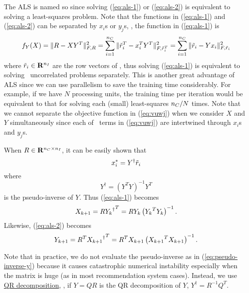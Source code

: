 The ALS is named so since solving (\ref{eq:als-1}) or (\ref{eq:als-2}) is equivalent to solving a least-squares problem.
Note that the functions in (\ref{eq:als-1}) and (\ref{eq:als-2}) can be separated by $x_i$s or $y_j$s,
\eg, the function in (\ref{eq:als-1}) is
\begin{equation}
\label{eq:bian}
f_Y(X) = \|R - XY^T\|_{F,R}^2
= \sum_{i=1}^{{n_C}} \|\tilde{r}_i^T-x_i^T Y^T\|_{F,\tilde{r}_i^T}^2
= \sum_{i=1}^{{n_C}} \|\tilde{r}_i-Yx_i\|_{F,\tilde{r}_i}^2
\end{equation}
where $\tilde{r}_i \in\mathbf{R}^{{n_I}}$ are the row vectors of \ratmat,
thus solving (\ref{eq:als-1}) is equivalent to solving \numcus\ uncorrelated problems separately.
This is another great advantage of ALS since we can use parallelism to save the training time considerably.
For example, if we have $N$ processing units, the training time per iteration would be equivalent to
that for solving each (small) least-squares ${n_C}/N$ times.
Note that we cannot separate the objective function in (\ref{eq:vuwj}) when we consider $X$ and $Y$ simultaneously
since each of \numrating\ terms in (\ref{eq:vuwj}) are intertwined through $x_i$s and $y_j$s.

When $R\in\mathbf{R}^{{n_C}\times{n_I}}$, it can be easily shown that
\begin{equation}
x_i^\ast =  Y^\dagger \tilde{r}_i
\end{equation}
where
\begin{equation}
\label{eq:pseudo-inverse-y}
Y^\dagger = (Y^TY)^{-1}Y^T
\end{equation}
is the pseudo-inverse of $Y$.
Thus (\ref{eq:als-1}) becomes
\begin{equation}
\label{eq:als-1-sol}
{{X}_{k+1}} = R {{{{Y}_{k}}}^\dagger}^T
= R {{{Y}_{k}}} \left({{{Y}_{k}}}^T{{{Y}_{k}}} \right)^{-1}.
\end{equation}
Likewise, (\ref{eq:als-2}) becomes
\begin{equation}
\label{eq:als-2-sol}
{{Y}_{k+1}} = R^T {{{{X}_{k+1}}}^\dagger}^T
= R^T {{{X}_{k+1}}} \left({{{X}_{k+1}}}^T{{{X}_{k+1}}} \right)^{-1}.
\end{equation}

Note that in practice, we do not evaluate the pseudo-inverse as in (\ref{eq:pseudo-inverse-y})
because it causes catastrophic numerical instability especially when the matrix is huge
(as in most recommendation system cases).
Instead, we use \href{https://en.wikipedia.org/wiki/QR_decomposition}{QR decomposition},
\ie, if $Y = QR$ is the QR decomposition of $Y$, $Y^\dagger = R^{-1} Q^T$.

